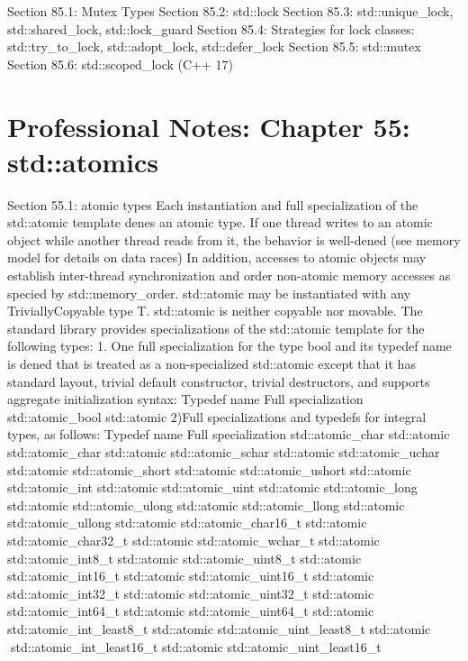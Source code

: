 Section 85.1: Mutex Types Section 85.2: std::lock Section 85.3:
std::unique\_lock, std::shared\_lock, std::lock\_guard Section 85.4:
Strategies for lock classes: std::try\_to\_lock, std::adopt\_lock,
std::defer\_lock Section 85.5: std::mutex Section 85.6:
std::scoped\_lock (C++ 17)

\hypertarget{professional-notes-chapter-55-stdatomics}{%
\section{Professional Notes: Chapter 55:
std::atomics}\label{professional-notes-chapter-55-stdatomics}}

Section 55.1: atomic types Each instantiation and full specialization of
the std::atomic template denes an atomic type. If one thread writes to
an atomic object while another thread reads from it, the behavior is
well-dened (see memory model for details on data races) In addition,
accesses to atomic objects may establish inter-thread synchronization
and order non-atomic memory accesses as specied by std::memory\_order.
std::atomic may be instantiated with any TriviallyCopyable type T.
std::atomic is neither copyable nor movable. The standard library
provides specializations of the std::atomic template for the following
types: 1. One full specialization for the type bool and its typedef name
is dened that is treated as a non-specialized std::atomic except that it
has standard layout, trivial default constructor, trivial destructors,
and supports aggregate initialization syntax: Typedef name Full
specialization std::atomic\_bool std::atomic 2)Full specializations and
typedefs for integral types, as follows: Typedef name Full
specialization std::atomic\_char std::atomic std::atomic\_char
std::atomic std::atomic\_schar std::atomic std::atomic\_uchar
std::atomic std::atomic\_short std::atomic std::atomic\_ushort
std::atomic std::atomic\_int std::atomic std::atomic\_uint std::atomic
std::atomic\_long std::atomic std::atomic\_ulong std::atomic
std::atomic\_llong std::atomic std::atomic\_ullong std::atomic
std::atomic\_char16\_t std::atomic std::atomic\_char32\_t std::atomic
std::atomic\_wchar\_t std::atomic std::atomic\_int8\_t std::atomic
std::atomic\_uint8\_t std::atomic std::atomic\_int16\_t std::atomic
std::atomic\_uint16\_t std::atomic std::atomic\_int32\_t std::atomic
std::atomic\_uint32\_t std::atomic std::atomic\_int64\_t std::atomic
std::atomic\_uint64\_t std::atomic std::atomic\_int\_least8\_t
std::atomic std::atomic\_uint\_least8\_t std::atomic
std::atomic\_int\_least16\_t std::atomic std::atomic\_uint\_least16\_t
